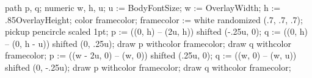 \setupinteraction[state=start, focus=standard, color=darkred]

\setuphead[title][header=empty, footer=empty, style=\bfb, align={middle,broad}]

\setupfootnotes[textstyle=bold]
\setuppagenumbering[location={footer, right}]


\setupwhitespace[medium]
\setupinterlinespace[line=16pt]

path p, q;
numeric w, h, u;
u := BodyFontSize;
w := OverlayWidth; h := .85OverlayHeight;
color framecolor; framecolor := white randomized (.7, .7, .7);
pickup pencircle scaled 1pt;
p := ((0, h) -- (2u, h)) shifted (-.25u, 0);
q := ((0, h) -- (0, h - u)) shifted (0, .25u);
draw p withcolor framecolor;
draw q withcolor framecolor;
p := ((w - 2u, 0) -- (w, 0)) shifted (.25u, 0);
q := ((w, 0) -- (w, u)) shifted (0, -.25u);
draw p withcolor framecolor;
draw q withcolor framecolor;
\stopuniqueMPgraphic
{}
\def\boxquote#1{%
  \kern.25em%
  \inframed[frame=off,background=boxquotebg,offset=0pt,loffset=.25em,roffset=.25em]{#1}%
  \kern.25em%
}
